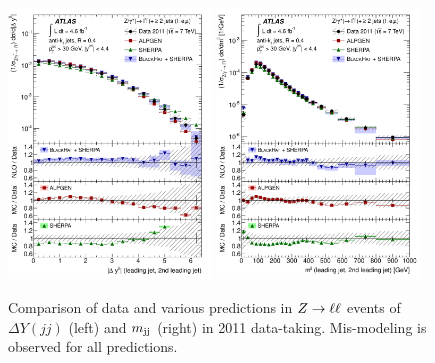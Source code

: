 \begin{figure}[tp]
  \centering
  \includegraphics[width=0.48\textwidth]{figures/STDM-2012-04/fig_11a}
  \includegraphics[width=0.48\textwidth]{figures/STDM-2012-04/fig_11b}
  \caption{Comparison of data and various predictions in $Z \rightarrow \ell\ell$ events of $\Delta Y(jj)$ (left) and $m_{\text{jj}}$ (right) in 2011 data-taking. Mis-modeling is observed for all predictions.}
  \label{fig:backgrounds-zjj}
\end{figure}


